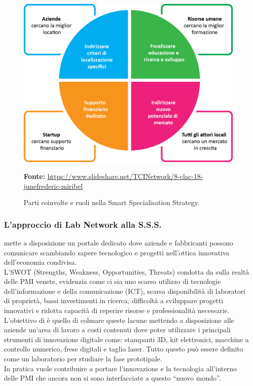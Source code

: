 \begin{figure}[H]
	\begin{center}
	\includegraphics[scale=0.37]{immagini/sss_graph.png}
	\caption{Parti coinvolte e ruoli nella Smart Specialisation Strategy.}
	\small{\textbf{Fonte:} \url{https://www.slideshare.net/TCINetwork/8-clac-18-junefrederic-miribel}}	
	\end{center}
\end{figure}
\subsubsection{L'approccio di Lab Network alla S.S.S.}
\lab{} mette a disposizione un portale dedicato dove aziende e fabbricanti possono comunicare scambiando sapere tecnologico e progetti nell'ottica innovativa dell'economia condivisa.
\\
L'\gls{SWOT} (Strengths, Weakness, Opportunities, Threats) condotta da \lab{} sulla realtà delle PMI venete, evidenzia come ci sia uno scarso utilizzo di tecnologie dell'informazione e della comunicazione (ICT), scarsa disponibilità di laboratori di proprietà, bassi investimenti in ricerca, difficoltà a sviluppare progetti innovativi e ridotta capacità di reperire risorse e professionalità necessarie. 
L'obiettivo di \lab{} è quello di colmare queste lacune mettendo a disposizione alle aziende un'area di lavoro a costi contenuti dove poter utilizzare i principali strumenti di innovazione digitale come: stampanti 3D, kit elettronici, macchine a controllo numerico, frese digitali e taglio laser. Tutto questo può essere definito come un laboratorio per studiare la fase prototipale.
\\
In pratica \lab{} vuole contribuire a portare l'innovazione e la tecnologia all'interno delle PMI che ancora non si sono interfacciate a questo ``nuovo mondo''.